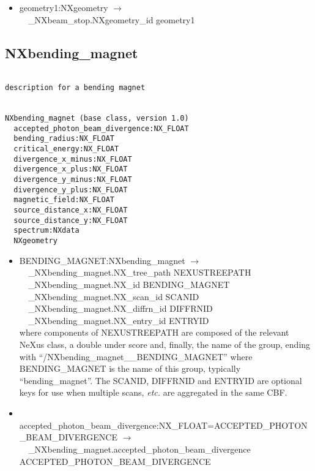 \documentclass[11pt]{article}
\begin{document}
{{\begin{itemize}
\item{geometry1:NXgeometry $\rightarrow$\\
\verb|  |\_NXbeam\_stop.NXgeometry\_id geometry1}
\end{itemize}
\subsection{NXbending\_magnet}

\begin{verbatim}

description for a bending magnet


NXbending_magnet (base class, version 1.0)
  accepted_photon_beam_divergence:NX_FLOAT
  bending_radius:NX_FLOAT
  critical_energy:NX_FLOAT
  divergence_x_minus:NX_FLOAT
  divergence_x_plus:NX_FLOAT
  divergence_y_minus:NX_FLOAT
  divergence_y_plus:NX_FLOAT
  magnetic_field:NX_FLOAT
  source_distance_x:NX_FLOAT
  source_distance_y:NX_FLOAT
  spectrum:NXdata
  NXgeometry
\end{verbatim}

\begin{itemize}

\item{BENDING\_MAGNET:NXbending\_magnet $\rightarrow$\\
\verb|  |\_NXbending\_magnet.NX\_tree\_path    NEXUSTREEPATH \\
\verb|  |\_NXbending\_magnet.NX\_id            BENDING\_MAGNET\\
\verb|  |\_NXbending\_magnet.NX\_scan\_id      SCANID \\
\verb|  |\_NXbending\_magnet.NX\_diffrn\_id    DIFFRNID \\
\verb|  |\_NXbending\_magnet.NX\_entry\_id     ENTRYID \\
where components of NEXUSTREEPATH are composed of the
relevant NeXus class, a double under score and, finally, the
name of the group, ending with ``/NXbending\_magnet\_\_BENDING\_MAGNET''
where BENDING\_MAGNET is the name of this group, typically ``bending\_magnet''.
The SCANID, DIFFRNID and ENTRYID are optional keys for use
when multiple scans, {\it etc.} are aggregated in the same CBF.}

\item{\verb|  |accepted\_photon\_beam\_divergence:NX\_FLOAT=ACCEPTED\_PHOTON\_BEAM\_DIVERGENCE $\rightarrow$\\
\verb|  |\_NXbending\_magnet.accepted\_photon\_beam\_divergence ACCEPTED\_PHOTON\_BEAM\_DIVERGENCE}


\end{itemize}}}
\end{document}
